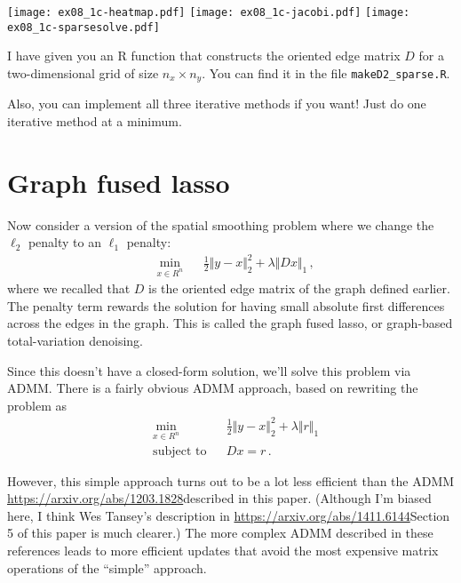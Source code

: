 \documentclass{article}
\begin{document}
\begin{enumerate}[(A)]
\begin{center}
\texttt{[image: ex08\_1c-heatmap.pdf]}
\texttt{[image: ex08\_1c-jacobi.pdf]}
\texttt{[image: ex08\_1c-sparsesolve.pdf]}
\end{center}
\color{black}

I have given you an R function that constructs the oriented edge matrix $D$ for a two-dimensional grid of size $n_x \times n_y$.  You can find it in the file \verb|makeD2_sparse.R|.

Also, you can implement all three iterative methods if you want!  Just do one iterative method at a minimum.

%

\section{Graph fused lasso}

Now consider a version of the spatial smoothing problem where we change the $\ell_2$ penalty to an $\ell_1$ penalty:
\begin{equation}
\begin{aligned}
& \min_{x \in R^n}
& & 
\frac{1}{2} \Vert y - x \Vert_2^2  + \lambda \Vert D x\Vert_1 \, ,
\end{aligned}
\end{equation}
where we recalled that $D$ is the oriented edge matrix of the graph defined earlier.  The penalty term rewards the solution for having small absolute first differences across the edges in the graph.  This is called the graph fused lasso, or graph-based total-variation denoising.

Since this doesn't have a closed-form solution, we'll solve this problem via ADMM.  There is a fairly obvious ADMM approach, based on rewriting the problem as
\begin{equation}
\begin{aligned}
& \min_{x \in R^n}
& & 
\frac{1}{2} \Vert y - x \Vert_2^2  + \lambda \Vert r \Vert_1 \\
& \text{subject to}
& & Dx = r \, .
\end{aligned}
\end{equation}

However, this simple approach turns out to be a lot less efficient than the ADMM \url{https://arxiv.org/abs/1203.1828}{described in this paper.}  (Although I'm biased here, I think Wes Tansey's description in \url{https://arxiv.org/abs/1411.6144}{Section 5 of this paper} is much clearer.)  The more complex ADMM described in these references leads to more efficient updates that avoid the most expensive matrix operations of the ``simple'' approach.


\end{enumerate}
\end{document}
